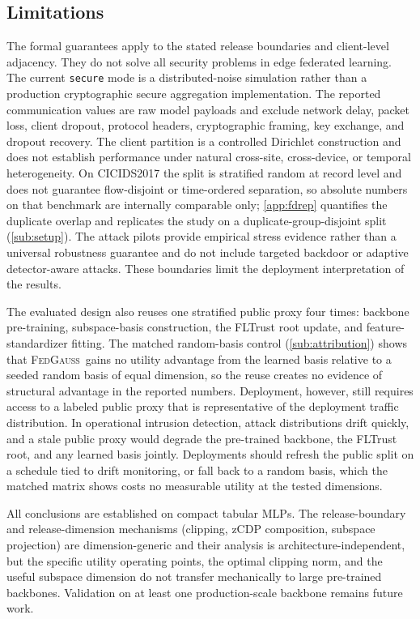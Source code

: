 \documentclass[a4paper,fleqn]{cas-dc}
\newcommand{\method}{\textsc{FedGauss}}
\begin{document}
\subsection{Limitations}
\label{subsec:limitations}
\par
The formal guarantees apply to the stated release boundaries and client-level
adjacency. They do not solve all security problems in edge federated
learning. The current \texttt{secure} mode is a distributed-noise simulation
rather than a production cryptographic secure aggregation implementation.
The reported communication values are raw model payloads and exclude network
delay, packet loss, client dropout, protocol headers, cryptographic framing,
key exchange, and dropout recovery. The client partition is a controlled
Dirichlet construction and does not establish performance under natural
cross-site, cross-device, or temporal heterogeneity. On CICIDS2017 the split
is stratified random at record level and does not guarantee flow-disjoint or
time-ordered separation, so absolute numbers on that benchmark are internally
comparable only; \cref{app:fdrep} quantifies the duplicate overlap
and replicates the study on a duplicate-group-disjoint split
(\cref{sub:setup}). The attack pilots provide empirical stress
evidence rather than a universal robustness guarantee and do not include
targeted backdoor or adaptive detector-aware attacks. These boundaries limit
the deployment interpretation of the results.
\par
The evaluated design also reuses one stratified public proxy four times: backbone pre-training, subspace-basis
construction, the FLTrust root update, and feature-standardizer fitting. The
matched random-basis control (\cref{sub:attribution}) shows that
\method\ gains no utility advantage from the learned basis relative to a
seeded random basis of equal dimension, so the reuse creates no evidence of
structural advantage in the reported numbers. Deployment, however, still
requires access to a labeled public proxy that is representative of the
deployment traffic distribution. In operational intrusion detection, attack
distributions drift quickly, and a stale public proxy would degrade the
pre-trained backbone, the FLTrust root, and any learned basis jointly.
Deployments should refresh the public split on a schedule tied to drift
monitoring, or fall back to a random basis, which the matched matrix shows
costs no measurable utility at the tested dimensions.
\par
All conclusions are established on compact tabular MLPs. The release-boundary and release-dimension mechanisms
(clipping, zCDP composition, subspace projection) are dimension-generic and
their analysis is architecture-independent, but the specific utility
operating points, the optimal clipping norm, and the useful subspace
dimension do not transfer mechanically to large pre-trained backbones.
Validation on at least one production-scale backbone remains future work.
\par
\end{document}
